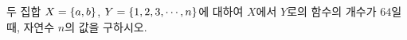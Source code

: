두 집합 $X=\{a{,}\mkern3mu\mathopen{}b\}$, $Y=\{1{,}\mkern3mu\mathopen{}2{,}\mkern3mu\mathopen{}3{,}\mkern3mu\mathopen{}\cdots{,}\mkern3mu\mathopen{}n\}$에 대하여 $X$에서 $Y$로의 함수의 개수가 $64$일 때, 자연수 $n$의 값을 구하시오.

